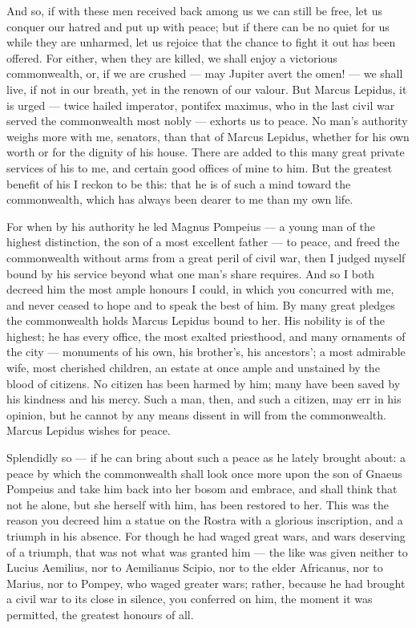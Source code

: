  And so, if with these men received back among us we can still be free, let us conquer our hatred and put up with peace; but if there can be no quiet for us while they are unharmed, let us rejoice that the chance to fight it out has been offered. For either, when they are killed, we shall enjoy a victorious commonwealth, or, if we are crushed --- may Jupiter avert the omen! --- we shall live, if not in our breath, yet in the renown of our valour. But Marcus Lepidus, it is urged --- twice hailed imperator, pontifex maximus, who in the last civil war served the commonwealth most nobly --- exhorts us to peace. No man's authority weighs more with me, senators, than that of Marcus Lepidus, whether for his own worth or for the dignity of his house. There are added to this many great private services of his to me, and certain good offices of mine to him. But the greatest benefit of his I reckon to be this: that he is of such a mind toward the commonwealth, which has always been dearer to me than my own life.

 For when by his authority he led Magnus Pompeius --- a young man of the highest distinction, the son of a most excellent father --- to peace, and freed the commonwealth without arms from a great peril of civil war, then I judged myself bound by his service beyond what one man's share requires. And so I both decreed him the most ample honours I could, in which you concurred with me, and never ceased to hope and to speak the best of him. By many great pledges the commonwealth holds Marcus Lepidus bound to her. His nobility is of the highest; he has every office, the most exalted priesthood, and many ornaments of the city --- monuments of his own, his brother's, his ancestors'; a most admirable wife, most cherished children, an estate at once ample and unstained by the blood of citizens. No citizen has been harmed by him; many have been saved by his kindness and his mercy. Such a man, then, and such a citizen, may err in his opinion, but he cannot by any means dissent in will from the commonwealth. Marcus Lepidus wishes for peace.

 Splendidly so --- if he can bring about such a peace as he lately brought about: a peace by which the commonwealth shall look once more upon the son of Gnaeus Pompeius and take him back into her bosom and embrace, and shall think that not he alone, but she herself with him, has been restored to her. This was the reason you decreed him a statue on the Rostra with a glorious inscription, and a triumph in his absence. For though he had waged great wars, and wars deserving of a triumph, that was not what was granted him --- the like was given neither to Lucius Aemilius, nor to Aemilianus Scipio, nor to the elder Africanus, nor to Marius, nor to Pompey, who waged greater wars; rather, because he had brought a civil war to its close in silence, you conferred on him, the moment it was permitted, the greatest honours of all.

